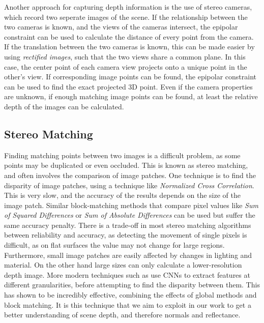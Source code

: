 \documentclass[ %
                    author={Gavin Parker},
                supervisor={Dr. Neill Campbell},
                    degree={MEng},
                     title={Deep Siamese Networks for Illumination Estimation from Stereo Images},
                  subtitle={},
                      type={Research},
                      year={2018} ]{dissertation}
\begin{document}
Another approach for capturing depth information is the use of stereo cameras, which record two seperate images of the scene. If the relationship between the two cameras is known, and the views of the cameras intersect, the epipolar constraint can be used to calculate the distance of every point from the camera. If the translation between the two cameras is known, this can be made easier by using \textit{rectified images}, such that the two views share a common plane. In this case, the center point of each camera view projects onto a unique point in the other's view. If corresponding image points can be found, the epipolar constraint can be used to find the exact projected 3D point. Even if the camera properties are unknown, if enough matching image points can be found, at least the relative depth of the images can be calculated.

\subsection{Stereo Matching}
Finding matching points between two images is a difficult problem, as some points may be duplicated or even occluded. This is known as stereo matching, and often involves the comparison of image patches. One technique is to find the disparity of image patches, using a technique like \textit{Normalized Cross Correlation}. This is very slow, and the accuracy of the results depends on the size of the image patch. Similar block-matching methods that compare pixel values like \textit{Sum of Squared Differences} or \textit{Sum of Absolute Differences} can be used but suffer the same accuracy penalty. There is a trade-off in most stereo matching algorithms between reliability and accuracy, as detecting the movement of single pixels is difficult, as on flat surfaces the value may not change for large regions. Furthermore, small image patches are easily affected by changes in lighting and material. On the other hand large sizes can only calculate a lower-resolution depth image. More modern techniques such as \cite{7780983} use CNNs to extract features at different granularities, before attempting to find the disparity between them. This has shown to be incredibly effective, combining the effects of global methods and block matching. It is this technique that we aim to exploit in our work to get a better understanding of scene depth, and therefore normals and reflectance.
\end{document}
